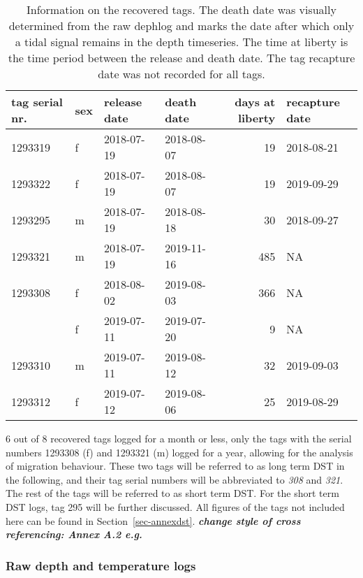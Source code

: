 \documentclass[
  authoryear,
  review,
  3p]{elsarticle}
\begin{document}
\hypertarget{tbl-dstsum}{}
\begin{table}[H]
\caption{\label{tbl-dstsum}Information on the recovered tags. The death date was visually
determined from the raw dephlog and marks the date after which only a
tidal signal remains in the depth timeseries. The time at liberty is the
time period between the release and death date. The tag recapture date
was not recorded for all tags. }\tabularnewline

\centering
\begin{tabular}{llllrl}
\toprule
tag serial nr. & sex & release date & death date & days at liberty & recapture date\\
\midrule
1293319 & f & 2018-07-19 & 2018-08-07 & 19 & 2018-08-21\\
1293322 & f & 2018-07-19 & 2018-08-07 & 19 & 2019-09-29\\
1293295 & m & 2018-07-19 & 2018-08-18 & 30 & 2018-09-27\\
1293321 & m & 2018-07-19 & 2019-11-16 & 485 & NA\\
1293308 & f & 2018-08-02 & 2019-08-03 & 366 & NA\\
\addlinespace
1293304 & f & 2019-07-11 & 2019-07-20 & 9 & NA\\
1293310 & m & 2019-07-11 & 2019-08-12 & 32 & 2019-09-03\\
1293312 & f & 2019-07-12 & 2019-08-06 & 25 & 2019-08-29\\
\bottomrule
\end{tabular}
\end{table}

6 out of 8 recovered tags logged for a month or less, only the tags with
the serial numbers 1293308 (f) and 1293321 (m) logged for a year,
allowing for the analysis of migration behaviour. These two tags will be
referred to as long term DST in the following, and their tag serial
numbers will be abbreviated to \emph{308} and \emph{321}. The rest of
the tags will be referred to as short term DST. For the short term DST
logs, tag 295 will be further discussed. All figures of the tags not
included here can be found in Section~\ref{sec-annexdst}.
\textbf{\emph{change style of cross referencing: Annex A.2 e.g.}}

\hypertarget{raw-depth-and-temperature-logs}{%
\subsubsection{Raw depth and temperature
logs}\label{raw-depth-and-temperature-logs}}
\end{document}
